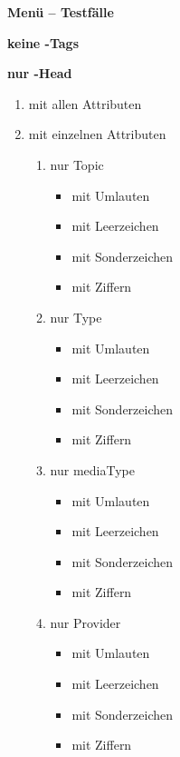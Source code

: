 \pagebreak

\centering \textbf{{\large Menü -- Testfälle}}



\flushleft \textbf{keine \SEARCH-Tags}


\flushleft \textbf{nur \SEARCH-Head}
\begin{enumerate}
   \item mit allen Attributen
   \item mit einzelnen Attributen  
   
   \begin{enumerate}  %
        \item nur Topic  
        \begin{itemize}
           \item mit Umlauten
           \item mit Leerzeichen
           \item mit Sonderzeichen
           \item mit Ziffern
        \end{itemize}
     
        \item nur Type
        \begin{itemize}
           \item mit Umlauten
           \item mit Leerzeichen
           \item mit Sonderzeichen
           \item mit Ziffern
        \end{itemize}
	
        \item nur mediaType
        \begin{itemize}
           \item mit Umlauten
           \item mit Leerzeichen
           \item mit Sonderzeichen
           \item mit Ziffern
        \end{itemize}
  
        \item nur Provider
        \begin{itemize}
           \item mit Umlauten
           \item mit Leerzeichen
           \item mit Sonderzeichen
           \item mit Ziffern
        \end{itemize}
  

\end{enumerate}
\end{enumerate}
